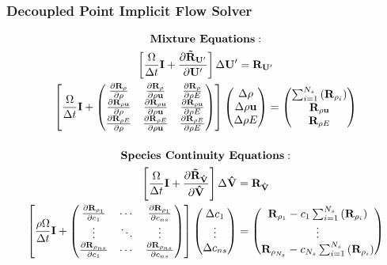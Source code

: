 \documentclass{beamer}
\begin{document}
\begin{frame}
  \frametitle{Decoupled Point Implicit Flow Solver}
  \vspace{-0.5cm}
  \small
\begin{gather*}
    \text{\bf{Mixture Equations}}: \\
    \left[ 
    \frac{\vol}{\Delta t}\mi + \drup
    \right] \Delta \Up
  =
  \res{\Up} \\
  \left[ 
    \frac{\vol}{\Delta t}\mi + 
    \begin{pmatrix}
      \rdiff{\rho}{\rho} & \rdiff{\rho}{\rho \vu} & \rdiff{\rho}{\rho E} \\
      \rdiff{\rho \vu}{\rho} & \rdiff{\rho \vu}{\rho \vu} & \rdiff{\rho \vu}{\rho E} \\
      \rdiff{\rho E}{\rho} & \rdiff{\rho E}{\rho \vu} & \rdiff{\rho E}{\rho E}
    \end{pmatrix}
  \right]
  \begin{pmatrix}
    \Delta \rho \\
    \Delta \rho \vu \\
    \Delta \rho E
  \end{pmatrix}
  =
  \begin{pmatrix}
    \resrho \\
    \res{\rho \vu} \\
    \res{\rho E}
  \end{pmatrix} \\[12pt]
    \text{\bf{Species Continuity Equations}}: \\
    \left[ 
    \frac{\vol}{\Delta t}\mi + \drvhat
    \right] \Delta \Vhat
    =
    \res{\Vhat} \\
  \left[
    \frac{\rho \vol}{\Delta t}\mi + 
    \begin{pmatrix}
      \rdiff{\rho_1}{c_1} & \cdots & \rdiff{\rho_{1}}{c_{ns}} \\
      \vdots & \ddots & \vdots \\
      \rdiff{\rho_{ns}}{c_1} & \cdots & \rdiff{\rho_{ns}}{c_{ns}}
    \end{pmatrix}
  \right]
  \begin{pmatrix}
    \Delta c_1 \\
    \vdots \\
    \Delta c_{ns}
  \end{pmatrix}
  =
  \begin{pmatrix}
    \res{\rho_1} - c_1 \resrho \\
    \vdots \\
    \res{\rho_{N_s}} - c_{N_s} \resrho
  \end{pmatrix}
\end{gather*}
\end{frame}
\end{document}
